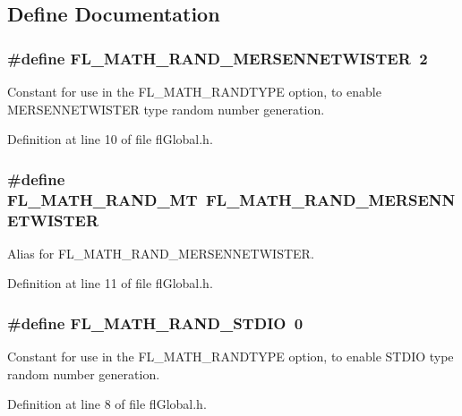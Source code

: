 \subsection{Define Documentation}
\subsubsection{\setlength{\rightskip}{0pt plus 5cm}\#define FL\_\-MATH\_\-RAND\_\-MERSENNETWISTER~2}\label{flGlobal_8h_f1d34adae4f3205dc89d3c038b3ff2be}


Constant for use in the FL\_\-MATH\_\-RANDTYPE option, to enable MERSENNETWISTER type random number generation. 



Definition at line 10 of file fl\-Global.h.
\subsubsection{\setlength{\rightskip}{0pt plus 5cm}\#define FL\_\-MATH\_\-RAND\_\-MT~FL\_\-MATH\_\-RAND\_\-MERSENNETWISTER}\label{flGlobal_8h_f22594809aab47e89601579931dcadd3}


Alias for FL\_\-MATH\_\-RAND\_\-MERSENNETWISTER. 



Definition at line 11 of file fl\-Global.h.
\subsubsection{\setlength{\rightskip}{0pt plus 5cm}\#define FL\_\-MATH\_\-RAND\_\-STDIO~0}\label{flGlobal_8h_edee4c7340f4d696f01177615358b152}


Constant for use in the FL\_\-MATH\_\-RANDTYPE option, to enable STDIO type random number generation. 



Definition at line 8 of file fl\-Global.h.
